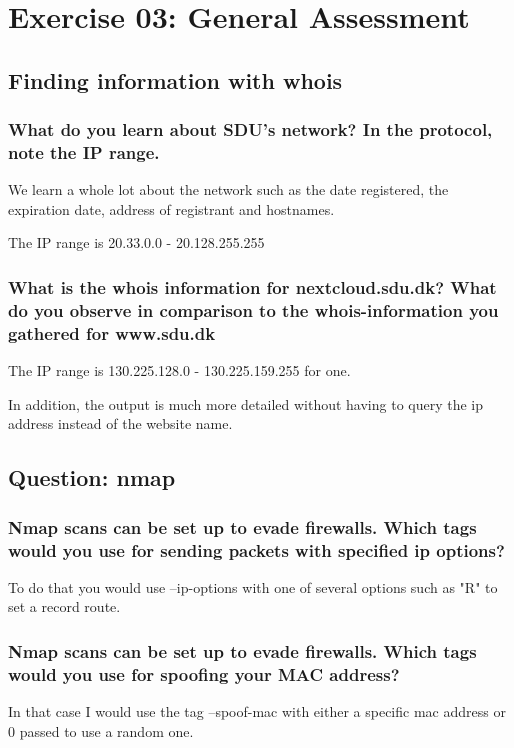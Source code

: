 \section{Exercise 03: General Assessment}

\subsection{Finding information with whois}

\subsubsection{What do you learn about SDU's network? In the protocol, note the IP range.}
We learn a whole lot about the network such as the date registered, the expiration date, address of registrant and hostnames.


The IP range is 20.33.0.0 - 20.128.255.255

\subsubsection{What is the whois information for nextcloud.sdu.dk? What do you observe in comparison to the whois-information you gathered for www.sdu.dk}


The IP range is 130.225.128.0 - 130.225.159.255 for one.

In addition, the output is much more detailed without having to query the ip address instead of the website name.

\subsection{Question: nmap}
\subsubsection{Nmap scans can be set up to evade firewalls. Which tags would you use for sending packets with specified ip options?}
To do that you would use --ip-options with one of several options such as "R" to set a record route.
\subsubsection{Nmap scans can be set up to evade firewalls. Which tags would you use for spoofing your MAC address?}
In that case I would use the tag --spoof-mac with either a specific mac address or 0 passed to use a random one.

